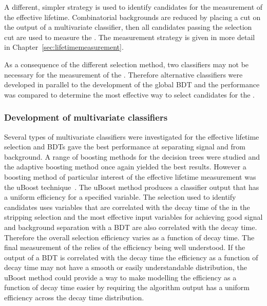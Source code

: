 A different, simpler strategy is used to identify candidates for the measurement of the \bsmumu effective lifetime. Combinatorial backgrounds are reduced by placing a cut on the output of a multivariate classifier, then all candidates passing the selection cut are used to measure the \el. The measurement strategy is given in more detail in Chapter~\ref{sec:lifetimemeasurement}. 

As a consequence of the different selection method, two classifiers may not be necessary for the measurement of the \el. Therefore alternative classifiers were developed in parallel to the development of the global BDT and the performance was compared to determine the most effective way to select candidates for the \elm. 

\subsubsection{Development of \el multivariate classifiers}
\label{sec:dev_BDTs}
Several types of multivariate classifiers were investigated for the effective lifetime selection and BDTs gave the best performance at separating signal and from background. A range of boosting methods for the decision trees were studied and the adaptive boosting method once again yielded the best results. %
However a boosting method of particular interest of the effective lifetime measurement was the uBoost technique~\cite{Stevens:2013dya}. The uBoost method produces a classifier output that has a uniform efficiency for a specified variable. The selection used to identify \bsmumu candidates uses variables that are correlated with the decay time of the \bs in the stripping selection and the most effective input variables for achieving good signal and background separation with a BDT are also correlated with the decay time. Therefore the overall selection efficiency varies as a function of decay time. The final measurement of the \el relies of the efficiency being well understood. If the output of a BDT is correlated with the \bs decay time the efficiency as a function of decay time may not have a smooth or easily understandable distribution, the uBoost method could provide a way to make modelling the efficiency as a function of decay time easier by requiring the algorithm output has a uniform efficiency across the decay time distribution.

